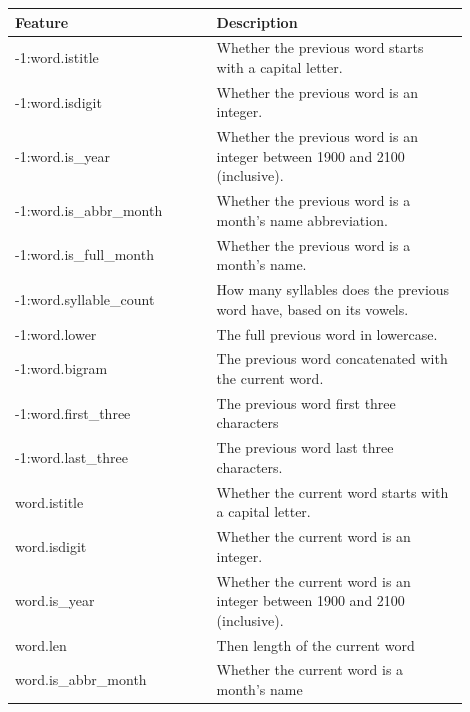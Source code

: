 \documentclass[a4paper, conference]{ieeeconf}
\begin{document}
  \begin{table}[ht!]
    \centering
    \begin{tabular}{|p{0.4\linewidth}|p{0.5\linewidth}|}
      \hline
      \textbf{Feature} & \textbf{Description} \\
      \hline
      \rowcolor{dark_blue}
      -1:word.istitle & Whether the previous word starts with a capital letter.
      \\
      \hline
      \rowcolor{dark_blue}
      -1:word.isdigit & Whether the previous word is an integer. \\
      \hline
      \rowcolor{dark_blue}
      -1:word.is\_year & Whether the previous word is an integer between 1900
      and 2100 (inclusive). \\
      \hline
      \rowcolor{dark_blue}
      -1:word.is\_abbr\_month & Whether the previous word is a month's name
      abbreviation. \\
      \hline
      \rowcolor{dark_blue}
      -1:word.is\_full\_month & Whether the previous word is a month's name. \\
      \hline
      \rowcolor{dark_blue}
      -1:word.syllable\_count & How many syllables does the previous word have,
      based on its vowels. \\
      \hline
      \rowcolor{dark_blue}
      -1:word.lower & The full previous word in lowercase. \\
      \hline
      \rowcolor{dark_blue}
      -1:word.bigram & The previous word concatenated with the current word. \\
      \hline
      \rowcolor{pale_yellow}
      -1:word.first\_three & The previous word first three characters \\
      \hline
      \rowcolor{pale_yellow}
      -1:word.last\_three & The previous word last three characters. \\
      \hline
      \rowcolor{blue}
      word.istitle & Whether the current word starts with a capital letter. \\
      \hline
      \rowcolor{blue}
      word.isdigit & Whether the current word is an integer. \\
      \hline
      \rowcolor{blue}
      word.is\_year & Whether the current word is an integer between 1900
      and 2100 (inclusive). \\
      \hline
      \rowcolor{blue}
      word.len & Then length of the current word \\
      \hline
      \rowcolor{blue}
      word.is\_abbr\_month & Whether the current word is a month's name

\end{tabular}
\end{table}
\end{document}
